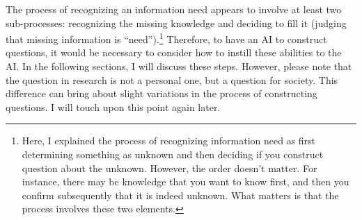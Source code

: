 The process of recognizing an information need appears to involve at least two sub-processes: recognizing the missing knowledge and deciding to fill it (judging that missing information is ``need'').\footnote{
Here, I explained the process of recognizing information need as first determining something as unknown and then deciding if you construct question about the unknown. However, the order doesn't matter. For instance, there may be knowledge that you want to know first, and then you confirm subsequently that it is indeed unknown. What matters is that the process involves these two elements.
} Therefore, to have an AI to construct questions, it would be necessary to consider how to instill these abilities to the AI. In the following sections, I will discuss these steps. However, please note that the question in research is not a personal one, but a question for society. This difference can bring about slight variations in the process of constructing questions. I will touch upon this point again later.




